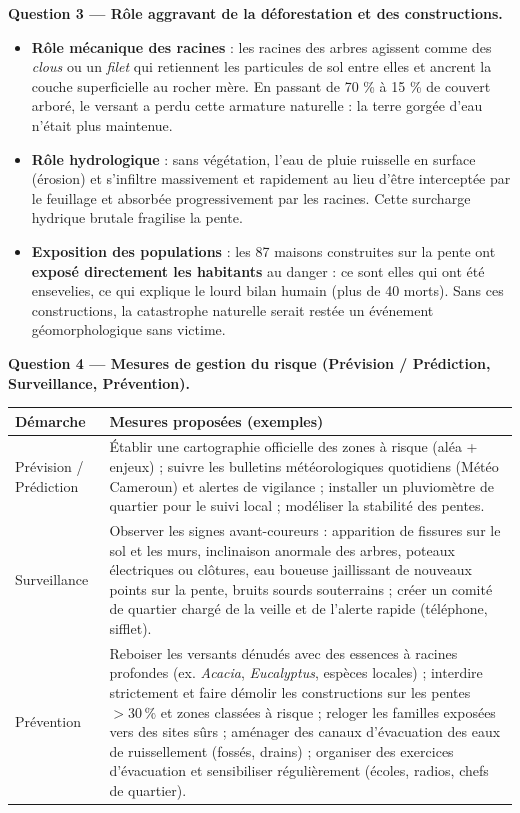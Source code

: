 \documentclass[11pt]{article}
\newcommand{\cle}[1]{{\popxbold\color{popdark}#1}}
\begin{document}
\begin{exoresolu}
\textbf{Question 3 — Rôle aggravant de la déforestation et des constructions.}\par
\begin{itemize}
\item \textbf{Rôle mécanique des racines} : les racines des arbres agissent comme des \emph{clous} ou un \emph{filet} qui retiennent les particules de sol entre elles et ancrent la couche superficielle au rocher mère. En passant de 70 \% à 15 \% de couvert arboré, le versant a perdu cette armature naturelle : la terre gorgée d'eau n'était plus maintenue.
\item \textbf{Rôle hydrologique} : sans végétation, l'eau de pluie ruisselle en surface (érosion) et s'infiltre massivement et rapidement au lieu d'être interceptée par le feuillage et absorbée progressivement par les racines. Cette surcharge hydrique brutale fragilise la pente.
\item \textbf{Exposition des populations} : les 87 maisons construites sur la pente ont \textbf{exposé directement les habitants} au danger : ce sont elles qui ont été ensevelies, ce qui explique le lourd bilan humain (plus de 40 morts). Sans ces constructions, la catastrophe naturelle serait restée un événement géomorphologique sans victime.
\end{itemize}

\textbf{Question 4 — Mesures de gestion du risque (Prévision / Prédiction, Surveillance, Prévention).}

\begin{center}
\begin{tabularx}{\linewidth}{|l|X|}\hline
\rowcolor{popblueL} \textbf{Démarche} & \textbf{Mesures proposées (exemples)} \\ \hline
\cle{Prévision / Prédiction} & Établir une cartographie officielle des zones à risque (aléa + enjeux) ; suivre les bulletins météorologiques quotidiens (Météo Cameroun) et alertes de vigilance ; installer un pluviomètre de quartier pour le suivi local ; modéliser la stabilité des pentes. \\ \hline
\cle{Surveillance} & Observer les signes avant-coureurs : apparition de fissures sur le sol et les murs, inclinaison anormale des arbres, poteaux électriques ou clôtures, eau boueuse jaillissant de nouveaux points sur la pente, bruits sourds souterrains ; créer un comité de quartier chargé de la veille et de l'alerte rapide (téléphone, sifflet). \\ \hline
\cle{Prévention} & Reboiser les versants dénudés avec des essences à racines profondes (ex. \emph{Acacia}, \emph{Eucalyptus}, espèces locales) ; interdire strictement et faire démolir les constructions sur les pentes $> 30\,\%$ et zones classées à risque ; reloger les familles exposées vers des sites sûrs ; aménager des canaux d'évacuation des eaux de ruissellement (fossés, drains) ; organiser des exercices d'évacuation et sensibiliser régulièrement (écoles, radios, chefs de quartier). \\ \hline
\end{tabularx}
\end{center}


\end{exoresolu}
\end{document}
